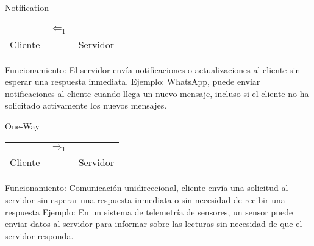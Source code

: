 \documentclass[a4paper,12pt]{article}
\begin{document}
\vspace{3mm}

\begin{center}
    \begin{minipage}[t]{0.45\textwidth}
        \begin{center}
            Notification        
    
            \begin{tabular}{c c c}
                        & $\Leftarrow_{1}$ &  \\                 
                Cliente &               & Servidor                    
            \end{tabular}
        \end{center}

        Funcionamiento: El servidor envía notificaciones o actualizaciones al cliente sin esperar una respuesta inmediata. 
        Ejemplo: WhatsApp, puede enviar notificaciones al cliente cuando llega un nuevo mensaje, incluso si el cliente no ha solicitado activamente los nuevos mensajes.
    \end{minipage}
    \hspace{15mm}
    \begin{minipage}[t]{0.45\textwidth}
        \begin{center}
            One-Way
            
            \begin{tabular}{c c c}
                        & $\Rightarrow_{1}$ &  \\ 
                Cliente &               & Servidor \\            
            \end{tabular}
        \end{center}

        Funcionamiento: Comunicación unidireccional, cliente envía una solicitud al servidor sin esperar una respuesta inmediata o sin necesidad de recibir una respuesta
        Ejemplo: En un sistema de telemetría de sensores, un sensor puede enviar datos al servidor para informar sobre las lecturas sin necesidad de que el servidor responda.
    \end{minipage}
\end{center}
    
\end{document}
